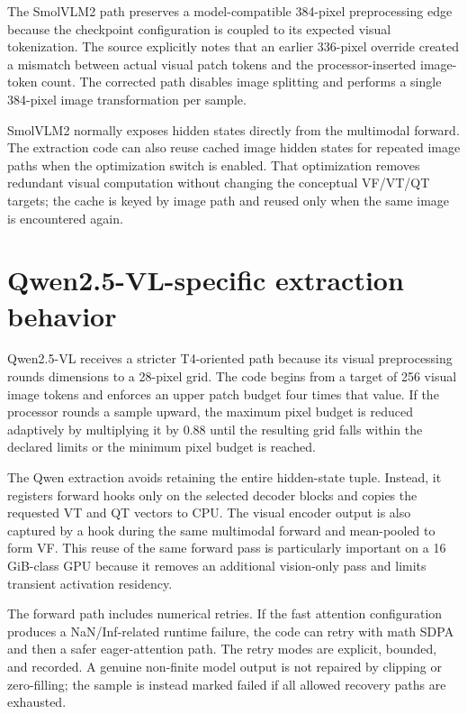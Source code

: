 \documentclass[11pt,a4paper]{article}
\begin{document}
The SmolVLM2 path preserves a model-compatible 384-pixel preprocessing edge because the checkpoint configuration is coupled to its expected visual tokenization. The source explicitly notes that an earlier 336-pixel override created a mismatch between actual visual patch tokens and the processor-inserted image-token count. The corrected path disables image splitting and performs a single 384-pixel image transformation per sample.

SmolVLM2 normally exposes hidden states directly from the multimodal forward. The extraction code can also reuse cached image hidden states for repeated image paths when the optimization switch is enabled. That optimization removes redundant visual computation without changing the conceptual VF/VT/QT targets; the cache is keyed by image path and reused only when the same image is encountered again.

\section{Qwen2.5-VL-specific extraction behavior}

Qwen2.5-VL receives a stricter T4-oriented path because its visual preprocessing rounds dimensions to a 28-pixel grid. The code begins from a target of 256 visual image tokens and enforces an upper patch budget four times that value. If the processor rounds a sample upward, the maximum pixel budget is reduced adaptively by multiplying it by 0.88 until the resulting grid falls within the declared limits or the minimum pixel budget is reached.

The Qwen extraction avoids retaining the entire hidden-state tuple. Instead, it registers forward hooks only on the selected decoder blocks and copies the requested VT and QT vectors to CPU. The visual encoder output is also captured by a hook during the same multimodal forward and mean-pooled to form VF. This reuse of the same forward pass is particularly important on a 16 GiB-class GPU because it removes an additional vision-only pass and limits transient activation residency.

The forward path includes numerical retries. If the fast attention configuration produces a NaN/Inf-related runtime failure, the code can retry with math SDPA and then a safer eager-attention path. The retry modes are explicit, bounded, and recorded. A genuine non-finite model output is not repaired by clipping or zero-filling; the sample is instead marked failed if all allowed recovery paths are exhausted.
\end{document}
